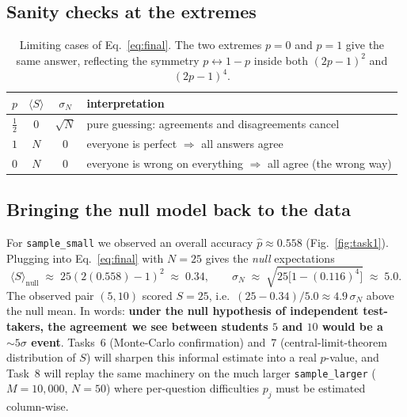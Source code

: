 \documentclass[11pt,a4paper]{article}
\begin{document}
\subsection{Sanity checks at the extremes}
\begin{table}[htb]
  \centering
  \begin{tabular}{c c c l}
    \toprule
    $p$ & $\langle S\rangle$ & $\sigma_N$ & interpretation \\
    \midrule
    $\tfrac12$ & $0$ & $\sqrt{N}$ & pure guessing: agreements and disagreements cancel \\
    $1$        & $N$ & $0$        & everyone is perfect $\Rightarrow$ all answers agree \\
    $0$        & $N$ & $0$        & everyone is wrong on everything $\Rightarrow$ all agree (the wrong way) \\
    \bottomrule
  \end{tabular}
  \caption{Limiting cases of Eq.~\eqref{eq:final}. The two extremes
  $p=0$ and $p=1$ give the same answer, reflecting the symmetry
  $p\leftrightarrow 1-p$ inside both $(2p-1)^2$ and $(2p-1)^4$.}
  \label{tab:limits}
\end{table}

\subsection{Bringing the null model back to the data}
For \texttt{sample\_small} we observed an overall accuracy
$\hat p \approx 0.558$ (Fig.~\ref{fig:task1}). Plugging into
Eq.~\eqref{eq:final} with $N=25$ gives the \emph{null} expectations
\begin{equation}
  \langle S\rangle_{\text{null}}
  \;\approx\; 25(2(0.558)-1)^2 \;\approx\; 0.34,
  \qquad
  \sigma_N \;\approx\; \sqrt{25\bigl[1-(0.116)^4\bigr]}\;\approx\;5.0.
\end{equation}
The observed pair $(5,10)$ scored $S=25$, i.e.\
$(25-0.34)/5.0 \approx 4.9\,\sigma_N$ above the null mean. In words:
\textbf{under the null hypothesis of independent test-takers, the
agreement we see between students $5$ and $10$ would be a $\sim 5\sigma$
event}. Tasks~6 (Monte-Carlo confirmation) and~7 (central-limit-theorem
distribution of $S$) will sharpen this informal estimate into a real
$p$-value, and Task~8 will replay the same machinery on the much larger
\texttt{sample\_larger} ($M=10{,}000$, $N=50$) where per-question
difficulties $p_j$ must be estimated column-wise.

\end{document}
